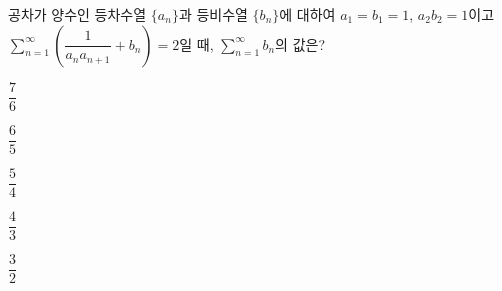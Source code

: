 공차가 양수인 등차수열 $\{a_n\}$과 등비수열 $\{b_n\}$에 대하여 $a_1=b_1=1$, $a_2b_2=1$이고 $\displaystyle\sum_{n=1}^{\infty}\left(\dfrac{1}{a_na_{n+1}}+b_n\right)=2$일 때, $\displaystyle\sum_{n=1}^{\infty}b_n$의 값은?
\begin{choices32}{\rule[-3ex]{0pt}{8ex}$\dfrac{7}{6}$}{\rule[-3ex]{0pt}{8ex}$\dfrac{6}{5}$}{\rule[-3ex]{0pt}{8ex}$\dfrac{5}{4}$}{\rule[-3ex]{0pt}{8ex}$\dfrac{4}{3}$}{\rule[-3ex]{0pt}{8ex}$\dfrac{3}{2}$}\end{choices32}
